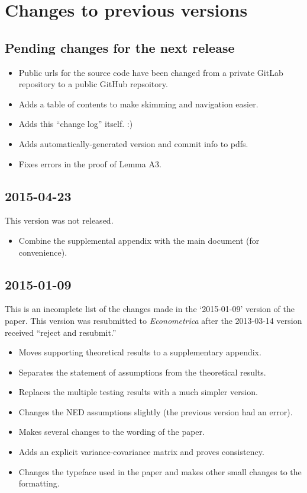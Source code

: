 \section{Changes to previous versions}
\subsection{Pending changes for the next release}

\begin{itemize}
\item Public urls for the source code have been changed from a private
GitLab repository to a public GitHub repsoitory.
\item Adds a table of contents to make skimming and navigation easier.
\item Adds this ``change log'' itself. :)
\item Adds automatically-generated version and commit info to pdfs.
\item Fixes errors in the proof of Lemma A3.
\end{itemize}

\subsection{2015-04-23}
This version was not released.

\begin{itemize}
\item Combine the supplemental appendix with the main document (for
convenience).
\end{itemize}

\subsection{2015-01-09}
This is an incomplete list of the changes made in the `2015-01-09'
version of the paper. This version was resubmitted to
\textit{Econometrica} after the 2013-03-14 version received ``reject
and resubmit.''

\begin{itemize}
\item Moves supporting theoretical results to a supplementary
appendix.
\item Separates the statement of assumptions from the theoretical
results.
\item Replaces the multiple testing results with a much simpler
version.
\item Changes the NED assumptions slightly (the previous version had
an error).
\item Makes several changes to the wording of the paper.
\item Adds an explicit variance-covariance matrix and proves
consistency.
\item Changes the typeface used in the paper and makes other small
changes to the formatting.
\end{itemize}

